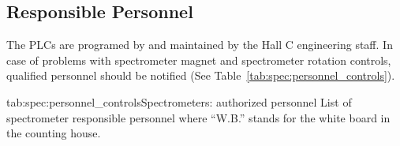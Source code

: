 \subsection{Responsible Personnel}
The PLCs are programed by and maintained by the Hall C engineering
staff.  In case of problems with spectrometer magnet and spectrometer
rotation controls, qualified personnel should be notified
(See Table~\ref{tab:spec:personnel_controls}).

\begin{namestab}{tab:spec:personnel_controls}{Spectrometers: authorized personnel}{%
      List of spectrometer responsible personnel where ``W.B.'' stands for the white board 
      in the counting house.}
   \MikeFowler{}
   \PaulBrindza{}
   \SteveLassiter{}
   \EricSun{}
\end{namestab}






